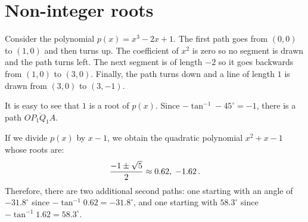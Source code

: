\newpage

\section{Non-integer roots}\label{s.noninteger}

Consider the polynomial $p(x)=x^3-2x+1$. The first path goes from $(0,0)$ to $(1,0)$ and then turns up. The coefficient of $x^2$ is zero so no segment is drawn and the path turns left. The next segment is of length $-2$ so it goes backwards from $(1,0)$ to $(3,0)$. Finally, the path turns down and a line of length $1$ is drawn from $(3,0)$ to $(3,-1)$.


It is easy to see that $1$ is a root of $p(x)$. Since $-\tan^{-1} -45^\circ=-1$, there is a path $\overline{OP_1Q_1A}$.

 If we divide $p(x)$ by $x-1$, we obtain the quadratic polynomial $x^2+x-1$ whose roots are:
\[
\displaystyle\frac{-1\pm\sqrt{5}}{2} \approx 0.62,\; -1.62\,.
\]
Therefore, there are two additional second paths: one starting with an angle of $-31.8^\circ$ since $-\tan^{-1} 0.62=-31.8^\circ$, and one starting with $58.3^\circ$ since $-\tan^{-1}1.62=58.3^\circ$.

